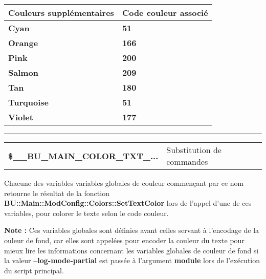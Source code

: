 \documentclass[a4paper,10pt]{article}
\begin{document}
\begin{justify}
    \begin{tabular}{|l|l|}
        \hline
        \textbf{Couleurs supplémentaires} & \textbf{Code couleur associé}\\
        \hline
        \textbf{\color{Cyan}Cyan} & \textbf{\color{Cyan}51}\\
        \hline
        \textbf{\color{Orange}Orange} & \textbf{\color{Orange}166}\\
        \hline
        \textbf{\color{Pink}Pink} & \textbf{\color{Pink}200}\\
        \hline
        \textbf{\color{Salmon}Salmon} & \textbf{\color{Salmon}209}\\
        \hline
        \textbf{\color{Tan}Tan} & \textbf{\color{Tan}180}\\
        \hline
        \textbf{\color{Turquoise}Turquoise} & \textbf{\color{Turquoise}51}\\
        \hline
        \textbf{\color{Violet}Violet} & \textbf{\color{Violet}177}\\
        \hline
    \end{tabular}
\end{justify}

\setlength{\parskip}{2em}


\par\noindent\rule{\textwidth}{0.4pt}

\setlength{\parskip}{1em}

\begin{justify}
    \begin{tabular}{l|l}
        \textbf{\color{vars}\$\_\_BU\_MAIN\_COLOR\_TXT\_...} & Substitution de commandes\\
    \end{tabular}
\end{justify}

\begin{justify}
    Chacune des variables variables globales de couleur commençant par ce nom retourne le résultat de la fonction \textbf{\color{func}BU::Main::ModConfig::Colors::SetTextColor} lors de l'appel d'une de ces variables, pour colorer le texte selon le code couleur.
\end{justify}

\begin{justify}
    \textbf{Note :} Ces variables globales sont définies avant celles servant à l'encodage de la ouleur de fond, car elles sont appelées pour encoder la couleur du texte pour mieux lire les informations concernant les variables globales de couleur de fond si la valeur \textbf{--log-mode-partial} est passée à l'argument \textbf{module} lors de l'exécution du script principal.
\end{justify}
\end{document}
